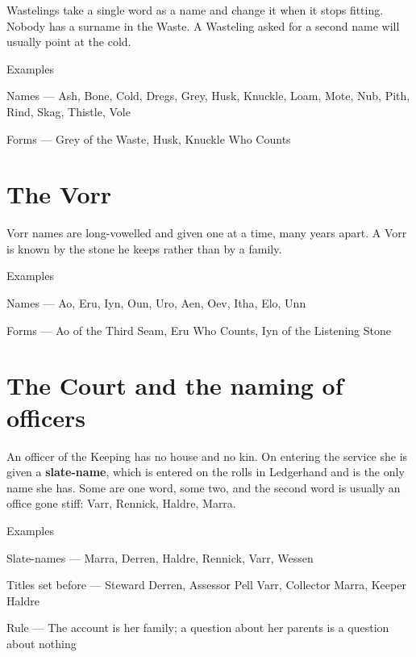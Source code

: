 \documentclass{design/chronicle}
\begin{document}
Wastelings take a single word as a name and change it when it stops fitting. Nobody has a surname in the Waste. A Wasteling asked for a second name will usually point at the cold.

Examples\par

Names — Ash, Bone, Cold, Dregs, Grey, Husk, Knuckle, Loam, Mote, Nub, Pith, Rind, Skag, Thistle, Vole\par

Forms — Grey of the Waste, Husk, Knuckle Who Counts\par

\section*{The Vorr}

Vorr names are long-vowelled and given one at a time, many years apart. A Vorr is known by the stone he keeps rather than by a family.

Examples\par

Names — Ao, Eru, Iyn, Oun, Uro, Aen, Oev, Itha, Elo, Unn\par

Forms — Ao of the Third Seam, Eru Who Counts, Iyn of the Listening Stone\par

\section*{The Court and the naming of officers}

An officer of the Keeping has no house and no kin. On entering the service she is given a \textbf{slate-name}, which is entered on the rolls in Ledgerhand and is the only name she has. Some are one word, some two, and the second word is usually an office gone stiff: Varr, Rennick, Haldre, Marra.

Examples\par

Slate-names — Marra, Derren, Haldre, Rennick, Varr, Wessen\par

Titles set before — Steward Derren, Assessor Pell Varr, Collector Marra, Keeper Haldre\par

Rule — The account is her family; a question about her parents is a question about nothing\par
\end{document}
